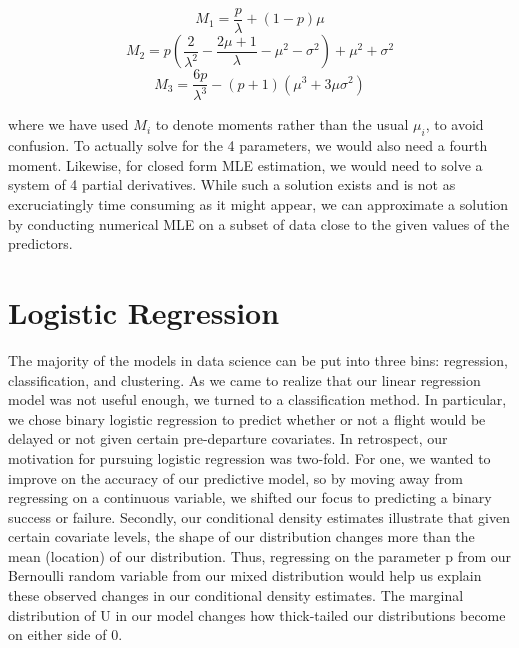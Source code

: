 \documentclass[12pt, a4paper]{book}
\newcommand\tab[1][1cm]{\hspace*{#1}}
\begin{document}
	\begin{center}
	$$M_1 = \frac{p}{\lambda} +(1- p)\mu$$
	$$M_2 = p\left(\frac{2}{\lambda^2} - \frac{2\mu+1}{\lambda} - \mu^2 - \sigma^2\right) +\mu^2 +\sigma^2$$
	$$M_3 = \frac{6p}{\lambda^3} -(p+1)(\mu^3 + 3\mu\sigma^2) $$
	\end{center} 
	where we have used $M_i$ to denote moments rather than the usual $\mu_i$, to avoid confusion. To actually solve for the 4 parameters, we would also need a fourth moment. Likewise, for closed form MLE estimation, we would need to solve a system of 4 partial derivatives. While such a solution exists and is not as excruciatingly time consuming as it might appear, we can approximate a solution by conducting numerical MLE on a subset of data close to the given values of the predictors. 
	\section{Logistic Regression}
	\tab The majority of the models in data science can be put into three bins: regression, classification, and clustering. As we came to realize that our linear regression model was not useful enough, we turned to a classification method. In particular, we chose binary logistic regression to predict whether or not a flight would be delayed or not given certain pre-departure covariates. In retrospect, our motivation for pursuing logistic regression was two-fold. For one, we wanted to improve on the accuracy of our predictive model, so by moving away from regressing on a continuous variable, we shifted our focus to predicting a binary success or failure. Secondly, our conditional density estimates illustrate that given certain covariate levels, the shape of our distribution changes more than the mean (location) of our distribution. Thus, regressing on the parameter p from our Bernoulli random variable from our mixed distribution would help us explain these observed changes in our conditional density estimates. The marginal distribution of U in our model changes how thick-tailed our distributions become on either side of 0. \\
\end{document}
